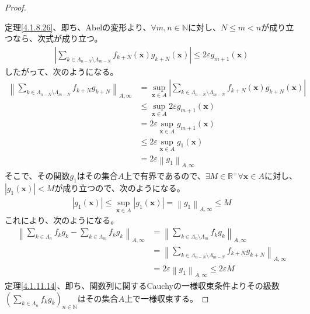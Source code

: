 \documentclass[dvipdfmx]{jsarticle}
\begin{document}
\begin{proof}
\begin{itemize}
\end{itemize}
定理\ref{4.1.8.26}、即ち、Abelの変形より、$\forall m,n \in \mathbb{N}$に対し、$N \leq m < n$が成り立つなら、次式が成り立つ。
\begin{align*}
\left| \sum_{k \in \varLambda_{n - N} \setminus \varLambda_{m - N}} {f_{k + N}\left( \mathbf{x} \right)g_{k + N}\left( \mathbf{x} \right)} \right| \leq 2\varepsilon g_{m + 1}\left( \mathbf{x} \right)
\end{align*}
したがって、次のようになる。
\begin{align*}
\left\| \sum_{k \in \varLambda_{n - N} \setminus \varLambda_{m - N}} {f_{k + N}g_{k + N}} \right\|_{A,\infty} &= \sup_{\mathbf{x} \in A}\left| \sum_{k \in \varLambda_{n - N} \setminus \varLambda_{m - N}} {f_{k + N}\left( \mathbf{x} \right)g_{k + N}\left( \mathbf{x} \right)} \right|\\
&\leq \sup_{\mathbf{x} \in A}{2\varepsilon g_{m + 1}\left( \mathbf{x} \right)}\\
&= 2\varepsilon\sup_{\mathbf{x} \in A}{g_{m + 1}\left( \mathbf{x} \right)}\\
&\leq 2\varepsilon\sup_{\mathbf{x} \in A}{g_{1}\left( \mathbf{x} \right)}\\
&= 2\varepsilon\left\| g_{1} \right\|_{A,\infty}
\end{align*}
そこで、その関数$g_{1}$はその集合$A$上で有界であるので、$\exists M \in \mathbb{R}^{+}\forall\mathbf{x} \in A$に対し、$\left| g_{1}\left( \mathbf{x} \right) \right| < M$が成り立つので、次のようになる。
\begin{align*}
\left| g_{1}\left( \mathbf{x} \right) \right| \leq \sup_{\mathbf{x} \in A}\left| g_{1}\left( \mathbf{x} \right) \right| = \left\| g_{1} \right\|_{A,\infty} \leq M
\end{align*}
これにより、次のようになる。
\begin{align*}
\left\| \sum_{k \in \varLambda_{n}} {f_{k}g_{k}} - \sum_{k \in \varLambda_{m}} {f_{k}g_{k}} \right\|_{A,\infty} &= \left\| \sum_{k \in \varLambda_{n} \setminus \varLambda_{m}} {f_{k}g_{k}} \right\|_{A,\infty}\\
&= \left\| \sum_{k \in \varLambda_{n - N} \setminus \varLambda_{m - N}} {f_{k + N}g_{k + N}} \right\|_{A,\infty}\\
&= 2\varepsilon\left\| g_{1} \right\|_{A,\infty} \leq 2\varepsilon M
\end{align*}
定理\ref{4.1.11.14}、即ち、関数列に関するCauchyの一様収束条件よりその級数$\left( \sum_{k \in \varLambda_{n}} {f_{k}g_{k}} \right)_{n \in \mathbb{N}}$はその集合$A$上で一様収束する。
\end{proof}
\end{document}
